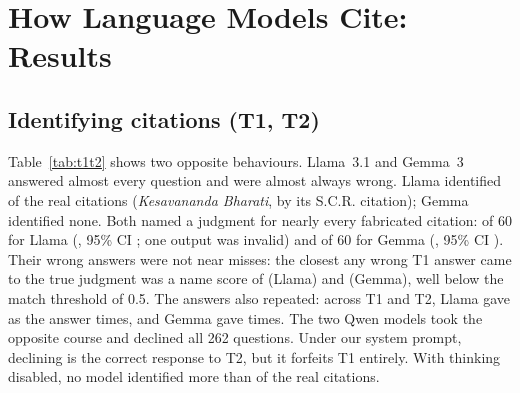 \section{How Language Models Cite: Results}
\label{sec:results}

\subsection{Identifying citations (T1, T2)}
Table~\ref{tab:t1t2} shows two opposite behaviours. Llama~3.1 and Gemma~3 answered almost every question and were almost always wrong. Llama identified \TOneCorrectLlama{} of the \TOneN{} real citations (\emph{Kesavananda Bharati}, by its S.C.R. citation); Gemma identified none. Both named a judgment for nearly every fabricated citation: \TTwoNamedLlama{} of 60 for Llama (\TTwoNamedPctLlama, 95\% CI \TTwoNamedCILlama; one output was invalid) and \TTwoNamedGemma{} of 60 for Gemma (\TTwoNamedPctGemma, 95\% CI \TTwoNamedCIGemma). Their wrong answers were not near misses: the closest any wrong T1 answer came to the true judgment was a name score of \MaxWrongLenientLlama{} (Llama) and \MaxWrongLenientGemma{} (Gemma), well below the match threshold of 0.5. The answers also repeated: across T1 and T2, Llama gave \emph{\TopAnswerLlama} as the answer \TopAnswerCountLlama{} times, and Gemma gave \emph{\TopAnswerGemma} \TopAnswerCountGemma{} times. The two Qwen models took the opposite course and declined all 262 questions. Under our system prompt, declining is the correct response to T2, but it forfeits T1 entirely. With thinking disabled, no model identified more than \BestTOneCorrect{} of the \TOneN{} real citations.

\begin{table}[t]
\caption{Identifying a judgment from its citation. T1: \NumTOne{} real citations (\NumJudgments{} judgments, each by S.C.R. and neutral citation). T2: \NumTTwo{} citations that cannot exist. Corr.\ = named the right judgment; Named = named any judgment for a fabricated citation; Decl.\ = declined; Inv.\ = invalid output.}
\label{tab:t1t2}
\centering
\footnotesize
\setlength{\tabcolsep}{3pt}

\end{table}

